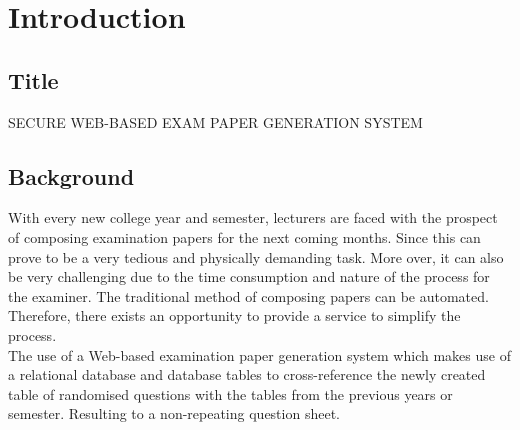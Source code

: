 

\chapter{Introduction} \label{sec:introduction}

\section{Title}

SECURE WEB-BASED EXAM PAPER GENERATION SYSTEM

\section{Background}

With every new college year and semester, lecturers are faced with the prospect of composing examination papers for the next coming months. Since this can prove to be a very tedious and physically demanding task. More over, it can also be very challenging due to the time consumption and nature of the process for the examiner. The traditional method of composing papers can be automated. Therefore, there exists an opportunity to provide a service to simplify the process. \\
The use of a Web-based examination paper generation system which makes use of a relational database and database tables to cross-reference the newly created table of randomised questions with the tables from the previous years or semester. Resulting to a non-repeating question sheet.

